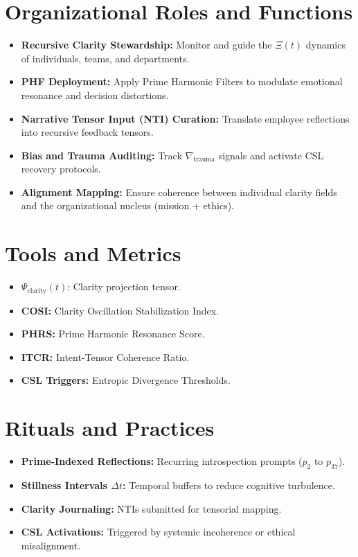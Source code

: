 \documentclass[12pt]{article}
\begin{document}
\section{Organizational Roles and Functions}
\begin{itemize}
    \item \textbf{Recursive Clarity Stewardship:} Monitor and guide the $\Xi(t)$ dynamics of individuals, teams, and departments.
    \item \textbf{PHF Deployment:} Apply Prime Harmonic Filters to modulate emotional resonance and decision distortions.
    \item \textbf{Narrative Tensor Input (NTI) Curation:} Translate employee reflections into recursive feedback tensors.
    \item \textbf{Bias and Trauma Auditing:} Track $\nabla_{\text{trauma}}$ signals and activate CSL recovery protocols.
    \item \textbf{Alignment Mapping:} Ensure coherence between individual clarity fields and the organizational nucleus (mission + ethics).
\end{itemize}

\section{Tools and Metrics}
\begin{itemize}
    \item $\Psi_{\text{clarity}}(t)$: Clarity projection tensor.
    \item \textbf{COSI:} Clarity Oscillation Stabilization Index.
    \item \textbf{PHRS:} Prime Harmonic Resonance Score.
    \item \textbf{ITCR:} Intent-Tensor Coherence Ratio.
    \item \textbf{CSL Triggers:} Entropic Divergence Thresholds.
\end{itemize}

\section{Rituals and Practices}
\begin{itemize}
    \item \textbf{Prime-Indexed Reflections:} Recurring introspection prompts ($p_2$ to $p_{37}$).
    \item \textbf{Stillness Intervals $\Delta t$:} Temporal buffers to reduce cognitive turbulence.
    \item \textbf{Clarity Journaling:} NTIs submitted for tensorial mapping.
    \item \textbf{CSL Activations:} Triggered by systemic incoherence or ethical misalignment.
\end{itemize}
\end{document}
